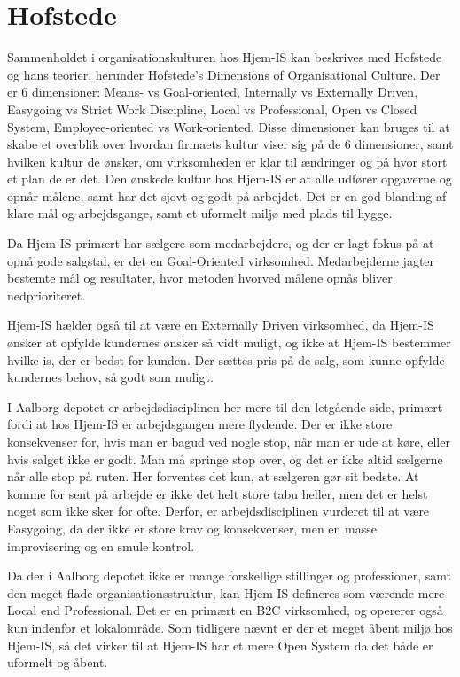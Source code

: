 \section{Hofstede}
Sammenholdet i organisationskulturen hos Hjem-IS kan beskrives med Hofstede og hans teorier, herunder Hofstede's Dimensions of Organisational Culture\cite{Quickbase}. 
Der er 6 dimensioner: Means- vs Goal-oriented, Internally vs Externally Driven, Easygoing vs Strict Work Discipline, Local vs Professional, Open vs Closed System, Employee-oriented vs Work-oriented. Disse dimensioner kan bruges til at skabe et overblik over hvordan firmaets kultur viser sig på de 6 dimensioner, samt hvilken kultur de ønsker, om virksomheden er klar til ændringer og på hvor stort et plan de er det. Den ønskede kultur hos Hjem-IS er at alle udfører opgaverne og opnår målene, samt har det sjovt og godt på arbejdet. Det er en god blanding af klare mål og arbejdsgange, samt et uformelt miljø med plads til hygge.

Da Hjem-IS primært har sælgere som medarbejdere, og der er lagt fokus på at opnå gode salgstal, er det en Goal-Oriented virksomhed. Medarbejderne jagter bestemte mål og resultater, hvor metoden hvorved målene opnås bliver nedprioriteret.

Hjem-IS hælder også til at være en Externally Driven virksomhed, da Hjem-IS ønsker at opfylde kundernes ønsker så vidt muligt, og ikke at Hjem-IS bestemmer hvilke is, der er bedst for kunden. Der sættes pris på de salg, som kunne opfylde kundernes behov, så godt som muligt.

I Aalborg depotet er arbejdsdisciplinen her mere til den letgående side, primært fordi at hos Hjem-IS er arbejdsgangen mere flydende. Der er ikke store konsekvenser for, hvis man er bagud ved nogle stop, når man er ude at køre, eller hvis salget ikke er godt. Man må springe stop over, og det er ikke altid sælgerne når alle stop på ruten. Her forventes det kun, at sælgeren gør sit bedste. At komme for sent på arbejde er ikke det helt store tabu heller, men det er helst noget som ikke sker for ofte. Derfor, er arbejdsdisciplinen vurderet til at være Easygoing, da der ikke er store krav og konsekvenser, men en masse improvisering og en smule kontrol.

Da der i Aalborg depotet ikke er mange forskellige stillinger og professioner, samt den meget flade organisationsstruktur, kan Hjem-IS defineres som værende mere Local end Professional. Det er en primært en B2C virksomhed\cite{B2C}, og opererer også kun indenfor et lokalområde. 
Som tidligere nævnt er der et meget åbent miljø hos Hjem-IS, så det virker til at Hjem-IS har et mere Open System da det både er uformelt og åbent. 

